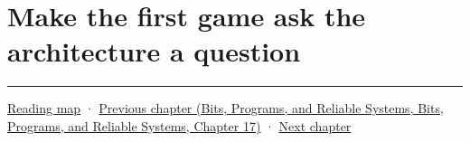 \section{Make the first game ask the architecture a question}\label{05-engine-i-ch008-make-the-first-game-ask-the-architecture-a-question}

\begin{center}\rule{0.5\linewidth}{0.5pt}\end{center}

\hyperref[volume-reading-map]{Reading map} · \href{../01-Bits-Programs-and-Reliable-Systems/main.pdf\#nameddest=05-engine-i-ch007-typed-apis-and-measured-cpu-data-structures}{Previous chapter (Bits, Programs, and Reliable Systems, Bits, Programs, and Reliable Systems, Chapter 17)} · \hyperref[05-engine-i-ch009-player-choices-rules-and-readable-feedback]{Next chapter}
